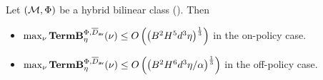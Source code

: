 \begin{lemma}\label{lem: bound Qcomp}

Let $(\mathcal{M}, \Phi)$ be a hybrid bilinear class ().  Then 
\begin{itemize}
    \item $\max_\nu \textbf{\textup{TermB}}^{\Phi, \overline{D}_{\mathsf{av}}}_\eta(\nu) \le O\left(\left( B^2H^5d^3 \eta \right)^{\frac{1}{3}}\right)$ in the on-policy case. 
    \item  %
    $\max_\nu \textbf{\textup{TermB}}^{\Phi, \overline{D}_{\mathsf{av}}}_\eta(\nu) \le O\left(\left( B^2H^6 d^3\eta/\alpha\right)^{\frac{1}{3}}\right)$ in the off-policy case.  
\end{itemize}




\label{lem:square_bilinear}
\end{lemma}

